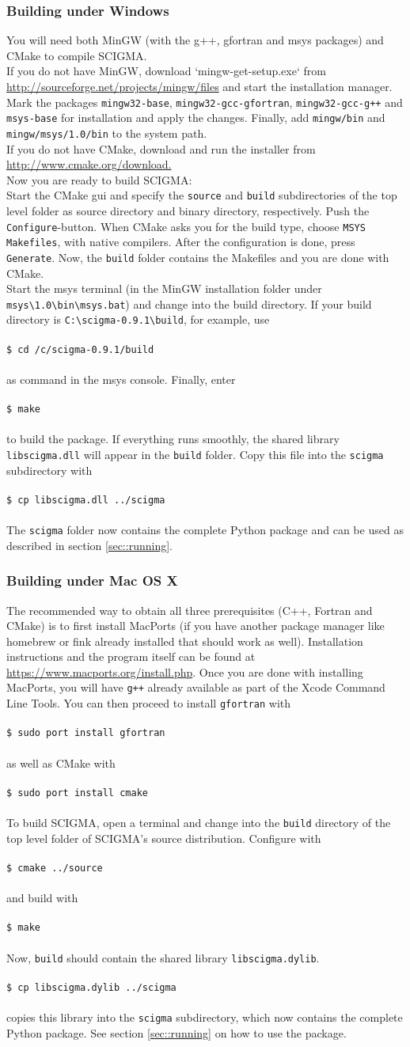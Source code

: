 \documentclass[10pt,a4paper,titlepage]{article}
\newcommand{\T}[1]{\texttt{#1}}
\newcommand{\C}[1]{\\\\\T{#1}\\\\}
\begin{document}
\subsubsection{Building under Windows}
You will need both MinGW (with the g++, gfortran and msys packages) and CMake
to compile SCIGMA.\\
If you do not have MinGW, download `mingw-get-setup.exe` from \url{http://sourceforge.net/projects/mingw/files} and start the installation manager. Mark the packages \T{mingw32-base}, \T{mingw32-gcc-gfortran}, \T{mingw32-gcc-g++} and \T{msys-base} for installation and
apply the changes. Finally, add \T{mingw/bin} and \T{mingw/msys/1.0/bin} to the system path.\\
If you do not have CMake, download and run the installer from \url{http://www.cmake.org/download.}\\
Now you are ready to build SCIGMA:\\  
Start the CMake gui and specify the \T{source} and \T{build} subdirectories of the top level folder as source directory and binary directory, respectively. Push the \T{Configure}-button. When CMake asks you for the build type, choose
 \T{MSYS Makefiles}, with native compilers. After the configuration is done, press \T{Generate}. Now, the \T{build} folder contains the Makefiles and you are done with CMake. \\
Start the msys terminal (in the MinGW installation folder under \T{msys\textbackslash1.0\textbackslash bin\textbackslash msys.bat}) and change into the build directory. If your build
directory is \T{C:\textbackslash scigma-0.9.1\textbackslash build}, for example, use
\C{\$ cd /c/scigma-0.9.1/build}
as command in the msys console. Finally, enter
\C{\$ make}
to build the package. If everything runs smoothly, the shared library \T{libscigma.dll} will appear in the \T{build} folder. Copy this file into the
\T{scigma} subdirectory with
\C{\$ cp libscigma.dll ../scigma}
The \T{scigma} folder now contains the complete Python package and can be used as described in section \ref{sec::running}.
\subsubsection{Building under Mac OS X}
 The recommended way to obtain all three prerequisites (C++, Fortran and CMake) is to first install MacPorts (if you have another package manager like homebrew or fink already installed that should work as well). Installation instructions and the program itself can be found at \url{https://www.macports.org/install.php}. Once you are done with installing MacPorts, you will have \T{g++} already available as part of the Xcode Command Line Tools. You can then proceed to install \T{gfortran} with
\C{\$ sudo port install gfortran}
as well as CMake with
\C{\$ sudo port install cmake}
To build SCIGMA, open a terminal and change into the \T{build} directory of the top level folder of SCIGMA's source distribution. Configure with
\C{\$ cmake ../source}
and build with
\C{\$ make}
Now, \T{build} should contain the shared library \T{libscigma.dylib}.
\C{\$ cp libscigma.dylib ../scigma}
copies this library into the \T{scigma} subdirectory, which now contains the complete Python package. See section \ref{sec::running} on how to use the package.	
\end{document}
